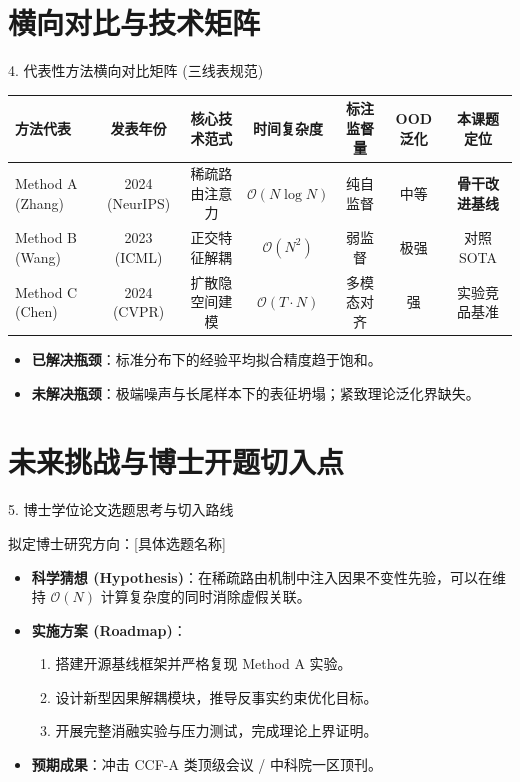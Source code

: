 \documentclass[aspectratio=169,10pt,UTF8]{ctexbeamer}
\begin{document}
\section{横向对比与技术矩阵}
\begin{frame}{4. 代表性方法横向对比矩阵 (三线表规范)}
  \centering
  \scriptsize
  \begin{tabular}{lcccccc}
    \toprule
    \textbf{方法代表} & \textbf{发表年份} & \textbf{核心技术范式} & \textbf{时间复杂度} & \textbf{标注监督量} & \textbf{OOD泛化} & \textbf{本课题定位} \\
    \midrule
    Method A (Zhang) & 2024 (NeurIPS) & 稀疏路由注意力 & $\mathcal{O}(N \log N)$ & 纯自监督 & 中等 & \textbf{骨干改进基线} \\
    Method B (Wang)  & 2023 (ICML)    & 正交特征解耦   & $\mathcal{O}(N^2)$      & 弱监督   & 极强 & 对照 SOTA \\
    Method C (Chen)  & 2024 (CVPR)    & 扩散隐空间建模 & $\mathcal{O}(T \cdot N)$& 多模态对齐 & 强   & 实验竞品基准 \\
    \bottomrule
  \end{tabular}
  \vspace{0.4cm}
  \begin{itemize}
    \item \textbf{已解决瓶颈}：标准分布下的经验平均拟合精度趋于饱和。
    \item \textbf{未解决瓶颈}：极端噪声与长尾样本下的表征坍塌；紧致理论泛化界缺失。
  \end{itemize}
\end{frame}

\section{未来挑战与博士开题切入点}
\begin{frame}{5. 博士学位论文选题思考与切入路线}
  \begin{block}{拟定博士研究方向：[具体选题名称]}
    \begin{itemize}
      \item \textbf{科学猜想 (Hypothesis)}：在稀疏路由机制中注入因果不变性先验，可以在维持 $\mathcal{O}(N)$ 计算复杂度的同时消除虚假关联。
      \item \textbf{实施方案 (Roadmap)}：
        \begin{enumerate}
          \item 搭建开源基线框架并严格复现 Method A 实验。
          \item 设计新型因果解耦模块，推导反事实约束优化目标。
          \item 开展完整消融实验与压力测试，完成理论上界证明。
        \end{enumerate}
      \item \textbf{预期成果}：冲击 CCF-A 类顶级会议 / 中科院一区顶刊。
    \end{itemize}
  \end{block}
\end{frame}
\end{document}
